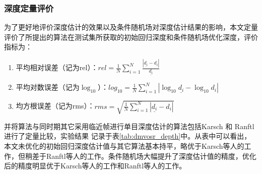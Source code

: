\subsubsection{深度定量评价}
为了更好地评价深度估计的效果以及条件随机场对深度估计结果的影响，本文定量评价了所提出的算法在测试集所获取的初始回归深度和条件随机场优化深度，评价指标为：
\begin{enumerate}
    \item 平均相对误差（记为rel）：$rel = \frac{1}{N}\sum_{i=1}^N \frac{|\underline{d_i}-d_i|}{\underline{d_i}}$
    \item 平均对数误差（记为$\log_{10}$）：$log_{10}=\frac{1}{N}\sum_{i=1}^N |\log_{10}\underline{d_i}-\log_{10} d_i|$
    \item 均方根误差（记为rms）：$rms = \sqrt{\frac{1}{N}\sum_{i=1}^N|\underline{d_i}-d_i|}$
\end{enumerate}
并将算法与同时期其它采用临近帧进行单目深度估计的算法包括Karsch\cite{karsch2014depth} 和 Ranftl\cite{ranftl2016dense}进行了定量比较，实验结果
记录于表\ref{tab:dmvosr_depth}中。从表中可以看出，本文未优化的初始回归深度估计值与其它算法基本持平，略优于Karsch等人的工作，但稍差于Ranftl等人的工作。条件随机场大幅提升了深度估计值的精度，优化后的精度明显优于Karsch等人的工作和Ranftl等人的工作。


